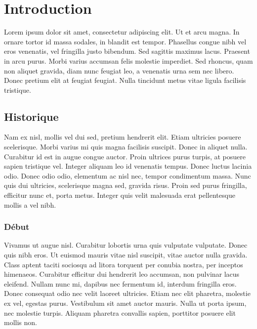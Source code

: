 \chapter{Introduction}

    Lorem ipsum dolor sit amet, consectetur adipiscing elit. Ut et arcu magna.
    In ornare tortor id massa sodales, in blandit est tempor. Phasellus congue
    nibh vel eros venenatis, vel fringilla justo bibendum. Sed sagittis maximus
    lacus. Praesent in arcu purus. Morbi varius accumsan felis molestie
    imperdiet. Sed rhoncus, quam non aliquet gravida, diam nunc feugiat leo, a
    venenatis urna sem nec libero. Donec pretium elit at feugiat feugiat. Nulla
    tincidunt metus vitae ligula facilisis tristique.

    \section{Historique}

    Nam ex nisl, mollis vel dui sed, pretium hendrerit elit. Etiam ultricies
    posuere scelerisque. Morbi varius mi quis magna facilisis suscipit. Donec
    in aliquet nulla. Curabitur id est in augue congue auctor. Proin ultrices
    purus turpis, at posuere sapien tristique vel. Integer aliquam leo id
    venenatis tempus. Donec luctus lacinia odio. Donec odio odio, elementum ac
    nisl nec, tempor condimentum massa. Nunc quis dui ultricies, scelerisque
    magna sed, gravida risus. Proin sed purus fringilla, efficitur nunc et,
    porta metus. Integer quis velit malesuada erat pellentesque mollis a vel
    nibh.

        \subsection{Début}

        Vivamus ut augue nisl. Curabitur lobortis urna quis vulputate
        vulputate.  Donec quis nibh eros. Ut euismod mauris vitae nisl
        suscipit, vitae auctor nulla gravida. Class aptent taciti sociosqu ad
        litora torquent per conubia nostra, per inceptos himenaeos. Curabitur
        efficitur dui hendrerit leo accumsan, non pulvinar lacus eleifend.
        Nullam nunc mi, dapibus nec fermentum id, interdum fringilla eros.
        Donec consequat odio nec velit laoreet ultricies. Etiam nec elit
        pharetra, molestie ex vel, egestas purus.  Vestibulum sit amet auctor
        mauris. Nulla ut porta ipsum, nec molestie turpis. Aliquam pharetra
        convallis sapien, porttitor posuere elit mollis non.

